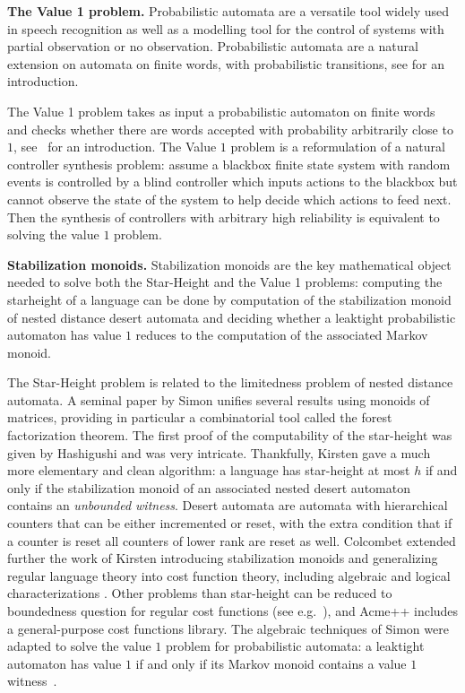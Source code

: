 \textbf{The Value 1 problem.} Probabilistic automata are a versatile tool widely used in speech recognition as well as a modelling tool for the control of systems with partial observation or no observation.
Probabilistic automata are a natural extension on automata on finite words,
with probabilistic transitions, see \cite{Rabin63} for an introduction.

The Value 1 problem takes as input a probabilistic automaton on finite words and checks whether there are words accepted with probability arbitrarily close to $1$, see~\cite{FGO12} for an introduction.
The Value $1$ problem is a reformulation of a natural controller synthesis problem:
assume a blackbox finite state system with random events
is controlled by a blind controller which inputs actions to the blackbox
but cannot observe the state of the system to help decide which actions to feed next.
Then the synthesis of controllers with arbitrary high reliability is equivalent to solving the value $1$ problem.



\textbf{ Stabilization monoids.} Stabilization monoids are the key mathematical object needed to solve both the Star-Height and the Value 1 problems:
computing the starheight of a language can be done by computation of the stabilization monoid of
nested distance desert automata and deciding whether a leaktight probabilistic automaton has value $1$
reduces to the computation of the associated Markov monoid.

The Star-Height problem is related to the limitedness problem of nested distance automata.
A seminal paper by Simon \cite{Sim94} unifies several results using monoids of matrices, providing in particular a combinatorial tool called the forest factorization theorem. 
The first proof of the computability of the star-height was given by Hashigushi and was very intricate.
Thankfully, Kirsten gave a much more elementary and clean algorithm:
a language has star-height at most $h$ if and only if the stabilization monoid of an associated nested desert automaton contains an \emph{unbounded witness}.
Desert automata are automata with hierarchical counters that can be either incremented or reset,
with the extra condition that if a counter is reset all counters of lower rank are reset as well.
Colcombet extended further the work of Kirsten introducing stabilization monoids and generalizing regular language theory into cost function theory, including algebraic and logical characterizations \cite{Colcombet09,CKL10,Kup14}. Other problems than star-height can be reduced to boundedness question for regular cost functions (see e.g.~\cite{CL08sh,CL08b,CKLB13}), and Acme++ includes a general-purpose cost functions library.
The algebraic techniques of Simon were adapted to solve the value $1$ problem for probabilistic automata:
a leaktight automaton has value $1$ if and only if its Markov monoid
contains a value $1$ witness~\cite{FGO12}.

